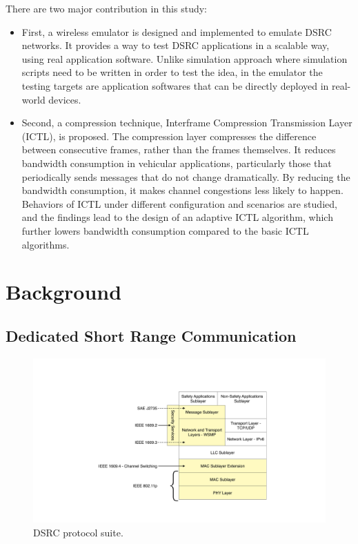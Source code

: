 \documentclass[12pt]{report}
\begin{document}
There are two major contribution in this study:
\begin{itemize}
  \item First, a wireless emulator is designed and implemented to emulate DSRC networks. It provides a way to test DSRC applications in a scalable way, using real application software. Unlike simulation approach where simulation scripts need to be written in order to test the idea, in the emulator the testing targets are application softwares that can be directly deployed in real-world devices.
  \item Second, a compression technique, Interframe Compression Transmission Layer (ICTL), is proposed. The compression layer compresses the difference between consecutive frames, rather than the frames themselves. It reduces bandwidth consumption in vehicular applications, particularly those that periodically sends messages that do not change dramatically. By reducing the bandwidth consumption, it makes channel congestions less likely to happen. Behaviors of ICTL under different configuration and scenarios are studied, and the findings lead to the design of an adaptive ICTL algorithm, which further lowers bandwidth consumption compared to the basic ICTL algorithms.
\end{itemize}

\chapter{Background}

\section{Dedicated Short Range Communication}

\begin{figure}[htb]
  \begin{center}
    \includegraphics[width=.7\columnwidth]{figures/dsrc.pdf}
    \caption{\label{fig:dsrc}DSRC protocol suite.}
  \end{center}
\end{figure}
\end{document}
